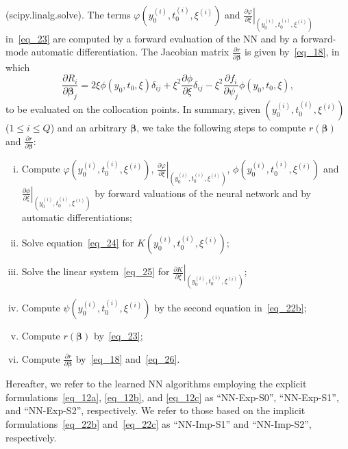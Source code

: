 \begin{remark}
  (scipy.linalg.solve).
  The terms $\varphi(y_0^{(i)},t_0^{(i)},\xi^{(i)})$ and 
  $\left.\frac{\partial\varphi}{\partial\xi} \right|_{(y_0^{(i)},t_0^{(i)},\xi^{(i)})}$
  in~\eqref{eq_23} are computed by a forward evaluation of the NN
  and by a forward-mode automatic differentiation.
  The Jacobian matrix $\frac{\partial r}{\partial\bm\beta}$ is given by~\eqref{eq_18},
  in which
  \begin{equation}\label{eq_26}
    \frac{\partial R_i}{\partial\bm\beta_j} =
    2\xi\phi(y_0,t_0,\xi)\delta_{ij} + \xi^2\frac{\partial\phi}{\partial\xi}\delta_{ij}
    -\xi^2\frac{\partial f_i}{\partial\psi_j}\phi(y_0,t_0,\xi),
  \end{equation}
  to be evaluated on the collocation points.
  In summary, given $(y_0^{(i)},t_0^{(i)},\xi^{(i)})$ ($1\leqslant i\leqslant Q$)
  and an arbitrary $\bm\beta$, we take the following steps to compute
  $r(\bm\beta)$ and $\frac{\partial r}{\partial\bm\beta}$:
  \begin{enumerate}[(i), nosep]
  \item Compute $\varphi(y_0^{(i)},t_0^{(i)},\xi^{(i)})$,
    $\left.\frac{\partial\varphi}{\partial\xi}\right|_{(y_0^{(i)},t_0^{(i)},\xi^{(i)})}$,
    $\phi(y_0^{(i)},t_0^{(i)},\xi^{(i)})$ and
    $\left.\frac{\partial\phi}{\partial\xi}\right|_{(y_0^{(i)},t_0^{(i)},\xi^{(i)})}$
    by forward valuations of the neural network and by automatic
    differentiations;

  \item Solve equation~\eqref{eq_24} for $K(y_0^{(i)},t_0^{(i)},\xi^{(i)})$;
  \item Solve the linear system~\eqref{eq_25} for
    $\left.\frac{\partial K}{\partial\xi} \right|_{(y_0^{(i)},t_0^{(i)},\xi^{(i)})}$;
  \item Compute $\psi(y_0^{(i)},t_0^{(i)},\xi^{(i)})$ by the second equation in~\eqref{eq_22b};
  \item Compute $r(\bm\beta)$ by~\eqref{eq_23};
  \item Compute $\frac{\partial r}{\partial\bm\beta}$ by~\eqref{eq_18}
    and~\eqref{eq_26}.
    
  \end{enumerate}

\end{remark}

\begin{remark}\label{rem_c26}
  Hereafter, we refer to the learned NN algorithms employing the explicit
  formulations~\eqref{eq_12a},
  \eqref{eq_12b}, and \eqref{eq_12c} as ``NN-Exp-S0'',
  ``NN-Exp-S1'', and ``NN-Exp-S2'', respectively.
  We refer to those based on the implicit formulations~\eqref{eq_22b}
  and~\eqref{eq_22c} as ``NN-Imp-S1'' and ``NN-Imp-S2'', respectively.
\end{remark}


